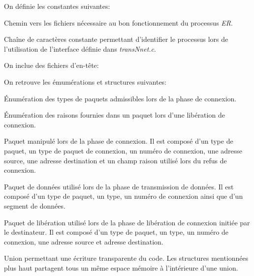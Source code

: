 \documentclass[11pt,french]{article}
\begin{document}
                On définie les constantes suivantes:
                
                Chemin vers les fichiers nécessaire au bon fonctionnement du processus \emph{ER}.
                
                Chaîne de caractères constante permettant d'identifier le processus lors de l'utilisation de l'interface définie dans \emph{transNnet.c}.

                \vspace{0.5cm}

                On inclue des fichiers d'en-tête:
                

                \vspace{0.5cm}

                On retrouve les émumérations et structures suivantes:
                
                Énumération des types de paquets admissibles lors de la phase de connexion.
                
                Énumération des raisons fournies dans un paquet lors d'une libération de connexion.
                
                Paquet manipulé lors de la phase de connexion. Il est composé d'un type de paquet, un type de paquet de connexion, un numéro de connexion, une adresse source, une adresse destination et
                un champ raison utilisé lors du refus de connexion.
                
                Paquet de données utilisé lors de la phase de transmission de données. Il est composé d'un type de paquet, un type, un numéro de connexion ainsi que d'un segment de données.
                
                Paquet de libération utilisé lors de la phase de libération de connexion initiée par le destinateur. Il est composé d'un type de paquet, un type, un numéro de connexion, une adresse source et adresse destination.
                
                Union permettant une écriture transparente du code. Les structures mentionnées plus haut partagent tous un même espace mémoire à l'intérieure d'une union.
                
                \vspace{0.5cm}
\end{document}
